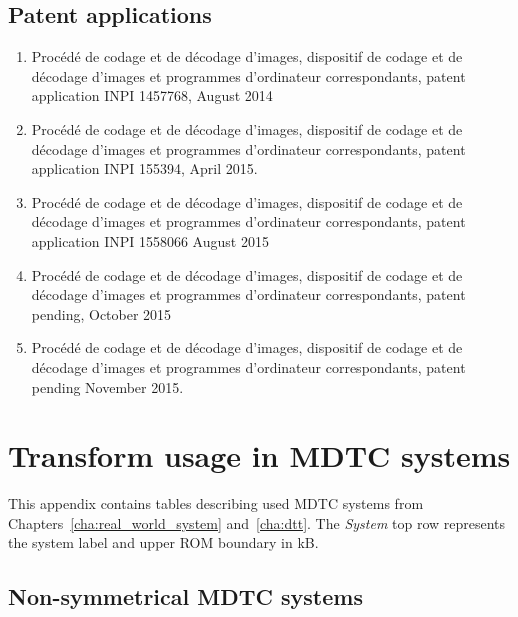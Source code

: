 \documentclass[11pt,a4paper,openright,twoside]{book}
\numberwithin{equation}{section} %
\numberwithin{figure}{section} %
\numberwithin{table}{section} %
\begin{document}
\clearpage

\section*{Patent applications}
\label{sec:patent_applications}

\begin{enumerate}
	\item Procédé de codage et de décodage d'images, dispositif de codage et
		de décodage d'images et programmes d'ordinateur correspondants,
		patent application INPI 1457768, August 2014
	\item Procédé de codage et de décodage d'images, dispositif de codage et
		de décodage d'images et programmes d'ordinateur correspondants,
		patent application INPI 155394, April 2015.
	\item Procédé de codage et de décodage d'images, dispositif de codage et
		de décodage d'images et programmes d'ordinateur correspondants,
		patent application INPI 1558066 August 2015
	\item Procédé de codage et de décodage d'images, dispositif de codage et
		de décodage d'images et programmes d'ordinateur correspondants,
		patent pending, October 2015
	\item Procédé de codage et de décodage d'images, dispositif de codage et
		de décodage d'images et programmes d'ordinateur correspondants,
		patent pending November 2015.
\end{enumerate}


\chapter{Transform usage in \acs{MDTC} systems}
\label{cha:transform_usage_in_mdtc_systems}

This appendix contains tables describing used \ac{MDTC} systems from
Chapters~\ref{cha:real_world_system} and~\ref{cha:dtt}.
The \emph{System} top row represents the system label and upper \acs{ROM}
boundary in kB.

\section*{Non-symmetrical \acs{MDTC} systems}
\label{sec:non_symmetrical_mdtc_systems}
\end{document}
